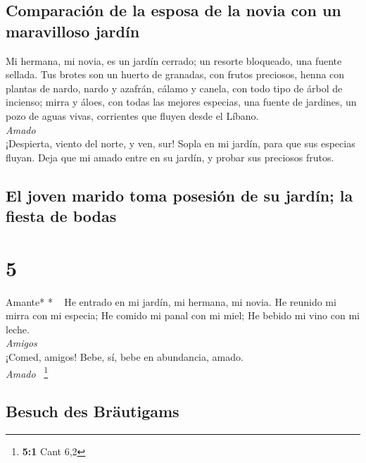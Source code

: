 \hypertarget{comparaciuxf3n-de-la-esposa-de-la-novia-con-un-maravilloso-jarduxedn}{%
\subsection{Comparación de la esposa de la novia con un maravilloso
jardín}\label{comparaciuxf3n-de-la-esposa-de-la-novia-con-un-maravilloso-jarduxedn}}

 Mi hermana, mi novia, es un jardín cerrado; un resorte
bloqueado, una fuente sellada.  Tus brotes son un huerto
de granadas, con frutos preciosos, henna con plantas de nardo,
 nardo y azafrán, cálamo y canela, con todo tipo de árbol
de incienso; mirra y áloes, con todas las mejores especias,
 una fuente de jardines, un pozo de aguas vivas,
corrientes que fluyen desde el Líbano.\\
\emph{Amado}\\
 ¡Despierta, viento del norte, y ven, sur! Sopla en mi
jardín, para que sus especias fluyan. Deja que mi amado entre en su
jardín, y probar sus preciosos frutos.

\hypertarget{el-joven-marido-toma-posesiuxf3n-de-su-jarduxedn-la-fiesta-de-bodas}{%
\subsection{El joven marido toma posesión de su jardín; la fiesta de
bodas}\label{el-joven-marido-toma-posesiuxf3n-de-su-jarduxedn-la-fiesta-de-bodas}}

\hypertarget{section-4}{%
\section{5}\label{section-4}}

\emph{\hfill\break
}Amante* * ~ He entrado en mi jardín, mi hermana, mi
novia. He reunido mi mirra con mi especia; He comido mi panal con mi
miel; He bebido mi vino con mi leche.\\
\emph{Amigos}\\
¡Comed, amigos! Bebe, sí, bebe en abundancia, amado.\\
\emph{Amado} ~\footnote{\textbf{5:1} Cant 6,2}

\hypertarget{besuch-des-bruxe4utigams}{%
\subsection{Besuch des Bräutigams}\label{besuch-des-bruxe4utigams}}

